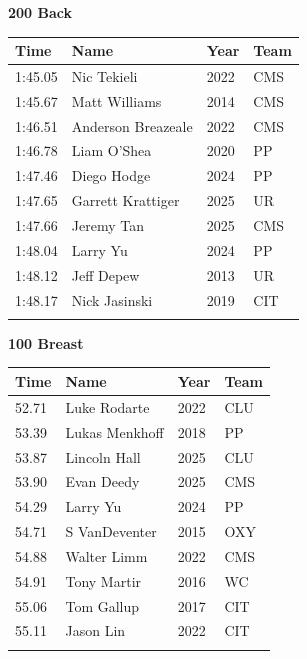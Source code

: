 \vspace{1.2em}
\noindent\begin{minipage}[t]{0.98\textwidth}
\centering
\textbf{\textcolor{teamprimary}{200 Back}}\par
\vspace{0.5em}
\centering
\small
\renewcommand{\arraystretch}{1.0}
\setlength{\tabcolsep}{4pt}
\begin{tabular}{@{}p{2.5cm}p{4.5cm}p{1.5cm}p{2.5cm}@{}}
\toprule
\textbf{Time} & \textbf{Name} & \textbf{Year} & \textbf{Team} \\
\midrule
1:45.05 & Nic Tekieli & 2022 & CMS \\
1:45.67 & Matt Williams & 2014 & CMS \\
1:46.51 & Anderson Breazeale & 2022 & CMS \\
1:46.78 & Liam O'Shea & 2020 & PP \\
1:47.46 & Diego Hodge & 2024 & PP \\
1:47.65 & Garrett Krattiger & 2025 & UR \\
1:47.66 & Jeremy Tan & 2025 & CMS \\
1:48.04 & Larry Yu & 2024 & PP \\
1:48.12 & Jeff Depew & 2013 & UR \\
1:48.17 & Nick Jasinski & 2019 & CIT \\
\bottomrule
\vspace{0.5em}
\end{tabular}
\end{minipage}
\vspace{1.2em}
\noindent\begin{minipage}[t]{0.98\textwidth}
\centering
\textbf{\textcolor{teamprimary}{100 Breast}}\par
\vspace{0.5em}
\centering
\small
\renewcommand{\arraystretch}{1.0}
\setlength{\tabcolsep}{4pt}
\begin{tabular}{@{}p{2.5cm}p{4.5cm}p{1.5cm}p{2.5cm}@{}}
\toprule
\textbf{Time} & \textbf{Name} & \textbf{Year} & \textbf{Team} \\
\midrule
52.71 & Luke Rodarte & 2022 & CLU \\
53.39 & Lukas Menkhoff & 2018 & PP \\
53.87 & Lincoln Hall & 2025 & CLU \\
53.90 & Evan Deedy & 2025 & CMS \\
54.29 & Larry Yu & 2024 & PP \\
54.71 & S VanDeventer & 2015 & OXY \\
54.88 & Walter Limm & 2022 & CMS \\
54.91 & Tony Martir & 2016 & WC \\
55.06 & Tom Gallup & 2017 & CIT \\
55.11 & Jason Lin & 2022 & CIT \\
\bottomrule
\vspace{0.5em}
\end{tabular}
\end{minipage}
